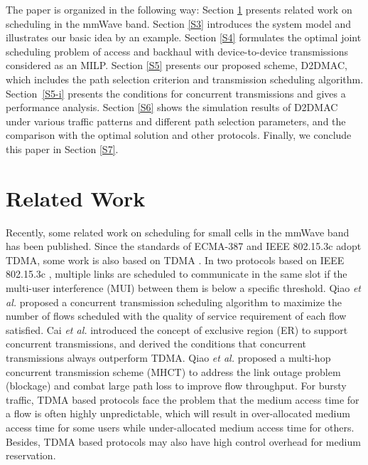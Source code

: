 \documentclass[journal]{IEEEtran}
\begin{document}
The paper is organized in the following way: Section \ref{S2} presents related work on scheduling
in the mmWave band. Section \ref{S3} introduces the system model and illustrates our basic idea by
an example. Section \ref{S4} formulates the optimal joint scheduling problem of access and backhaul
with device-to-device transmissions considered as an MILP. Section \ref{S5} presents our proposed
scheme, D2DMAC, which includes the path selection criterion and transmission scheduling algorithm.
Section~\ref{S5-i} presents the conditions for concurrent transmissions and gives a performance
analysis. Section \ref{S6} shows the simulation results of D2DMAC under various traffic patterns
and different path selection parameters, and the comparison with the optimal solution and other
protocols. Finally, we conclude this paper in Section \ref{S7}.









\section{Related Work}\label{S2}



Recently, some related work on scheduling for small cells in the mmWave band has been
published. Since the standards of ECMA-387 \cite{ECMA 387} and IEEE 802.15.3c \cite{IEEE 802.15.3c}
adopt TDMA, some work is also based on TDMA \cite{mao_12, mao_13, Qiao_6, Qiao_15, Qiao, EX_Region, Qiao_7}. In two
protocols based on IEEE 802.15.3c \cite{Qiao_6, Qiao_15}, multiple links are scheduled to
communicate in the same slot if the multi-user interference (MUI) between them is below a specific
threshold. Qiao \emph{et al.} \cite{Qiao} proposed a concurrent transmission scheduling algorithm
to maximize the number of flows scheduled with the quality of service requirement of each flow
satisfied. Cai \emph{et al.} \cite{EX_Region} introduced the concept of exclusive region (ER) to
support concurrent transmissions, and derived the conditions that concurrent transmissions always
outperform TDMA. Qiao \emph{et al.} \cite{Qiao_7} proposed a multi-hop concurrent transmission
scheme (MHCT) to address the link outage problem (blockage) and combat large path loss to improve
flow throughput. For bursty traffic, TDMA based protocols face the problem that the medium access
time for a flow is often highly unpredictable, which will result in over-allocated medium access
time for some users while under-allocated medium access time for others. Besides, TDMA based
protocols may also have high control overhead for medium reservation.
\end{document}
